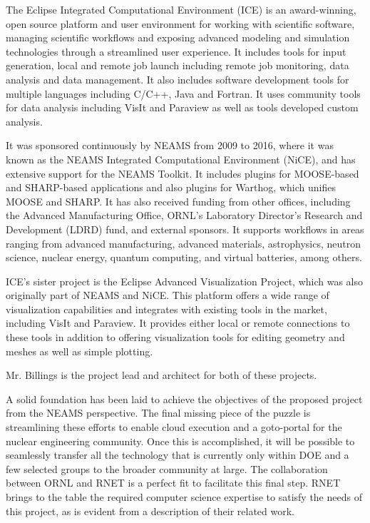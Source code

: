 The Eclipse Integrated Computational Environment (ICE) is an award-winning, open source platform and user environment for working with scientific software, managing scientific 
workflows and exposing advanced modeling and simulation technologies through a streamlined user experience. It includes tools
for input generation, local and remote job launch including remote job monitoring, data analysis and data management. It also
includes software development tools for multiple languages including C/C++, Java and Fortran. It uses community tools for data
analysis including VisIt and Paraview as well as tools developed custom analysis.

It was sponsored continuously by NEAMS from 2009 to 2016, where it was known as the NEAMS Integrated Computational Environment (NiCE), and has extensive 
support for the NEAMS Toolkit. It includes plugins for MOOSE-based and 
SHARP-based applications and also plugins for Warthog, which unifies MOOSE and 
SHARP. It has also received funding from other offices, including the Advanced 
Manufacturing Office, ORNL's Laboratory Director's Research and Development 
(LDRD) fund, and external sponsors. It supports workflows in areas ranging from 
advanced manufacturing, advanced materials, astrophysics, neutron science, 
nuclear energy, quantum computing, and virtual batteries, among others.

ICE's sister project is the Eclipse Advanced Visualization Project, which was also originally part of NEAMS and NiCE. This platform offers a wide range of visualization capabilities and integrates with existing tools in the market, including VisIt and Paraview. It provides either local or remote connections to these tools in addition to offering visualization tools for editing geometry and meshes as well as simple plotting.

Mr. Billings is the project lead and architect for both of these projects.

A solid foundation has been laid to achieve the objectives of the proposed project from the NEAMS perspective. The final 
missing piece of the puzzle is streamlining these efforts to enable cloud execution and a goto-portal for the nuclear 
engineering community. Once this is accomplished, it will be possible to seamlessly transfer all the technology that is 
currently only within DOE and a few selected groups to the broader community at large. The collaboration between ORNL and 
RNET is a perfect fit to facilitate this final step. RNET brings to the table the required computer science expertise to 
satisfy the needs of this project, as is evident from a description of their related work.
